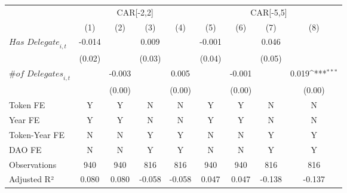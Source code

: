 {
\def\sym#1{\ifmmode^{#1}\else\(^{#1}\)\fi}
\begin{tabular}{l*{8}{c}}
\toprule
                    &\multicolumn{4}{c}{CAR[-2,2]}                                                          &\multicolumn{4}{c}{CAR[-5,5]}                                                          \\\cmidrule(lr){2-5}\cmidrule(lr){6-9}
                    &\multicolumn{1}{c}{(1)}         &\multicolumn{1}{c}{(2)}         &\multicolumn{1}{c}{(3)}         &\multicolumn{1}{c}{(4)}         &\multicolumn{1}{c}{(5)}         &\multicolumn{1}{c}{(6)}         &\multicolumn{1}{c}{(7)}         &\multicolumn{1}{c}{(8)}         \\
\midrule
$\textit{Has Delegate}_{i,t}$&      -0.014         &                     &       0.009         &                     &      -0.001         &                     &       0.046         &                     \\
                    &      (0.02)         &                     &      (0.03)         &                     &      (0.04)         &                     &      (0.05)         &                     \\
$\textit{\# of Delegates}_{i,t}$&                     &      -0.003         &                     &       0.005         &                     &      -0.001         &                     &       0.019\sym{***}\\
                    &                     &      (0.00)         &                     &      (0.00)         &                     &      (0.00)         &                     &      (0.00)         \\
\midrule
Token FE            &           Y         &           Y         &           N         &           N         &           Y         &           Y         &           N         &           N         \\
Year FE             &           Y         &           Y         &           N         &           N         &           Y         &           Y         &           N         &           N         \\
Token-Year FE       &           N         &           N         &           Y         &           Y         &           N         &           N         &           Y         &           Y         \\
DAO FE              &           N         &           N         &           Y         &           Y         &           N         &           N         &           Y         &           Y         \\
Observations        &         940         &         940         &         816         &         816         &         940         &         940         &         816         &         816         \\
Adjusted R²         &       0.080         &       0.080         &      -0.058         &      -0.058         &       0.047         &       0.047         &      -0.138         &      -0.137         \\
\bottomrule
\end{tabular}
}
